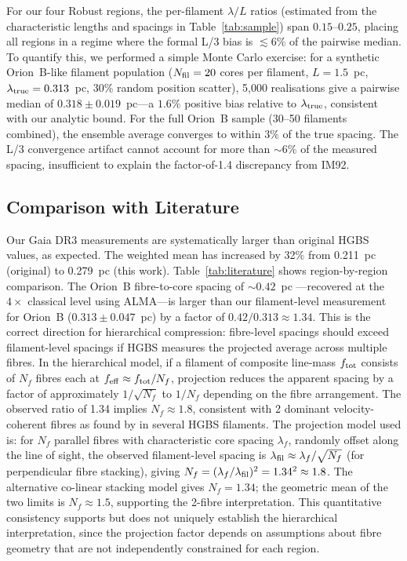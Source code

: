 \documentclass[twoside,twocolumn]{mnras}
\begin{document}
For our four Robust regions, the per-filament $\lambda/L$ ratios (estimated from the characteristic lengths and spacings in Table~\ref{tab:sample}) span $0.15$--$0.25$, placing all regions in a regime where the formal L/3 bias is $\lesssim 6\%$ of the pairwise median. To quantify this, we performed a simple Monte Carlo exercise: for a synthetic Orion~B-like filament population ($N_{\rm fil} = 20$ cores per filament, $L = 1.5$~pc, $\lambda_{\rm true} = 0.313$~pc, 30\% random position scatter), 5,000 realisations give a pairwise median of $0.318 \pm 0.019$~pc---a $1.6\%$ positive bias relative to $\lambda_{\rm true}$, consistent with our analytic bound. For the full Orion~B sample (30--50 filaments combined), the ensemble average converges to within $3\%$ of the true spacing. The L/3 convergence artifact cannot account for more than $\sim 6\%$ of the measured spacing, insufficient to explain the factor-of-1.4 discrepancy from IM92.

\subsection{Comparison with Literature}

Our Gaia DR3 measurements are systematically larger than original HGBS values, as
expected. The weighted mean has increased by 32\% from 0.211~pc (original) to
0.279~pc (this work). Table~\ref{tab:literature} shows region-by-region comparison.
The Orion~B fibre-to-core spacing of ${\sim}0.42$~pc \citep{Yang2024}---recovered at the
$4\times$ classical level using ALMA---is larger than our filament-level measurement for
Orion~B ($0.313 \pm 0.047$~pc) by a factor of $0.42/0.313 \approx 1.34$. This is the
correct direction for hierarchical compression: fibre-level spacings should exceed
filament-level spacings if HGBS measures the projected average across multiple fibres.
In the hierarchical model, if a filament of composite line-mass $f_{\rm tot}$ consists
of $N_f$ fibres each at $f_{\rm eff} \approx f_{\rm tot}/N_f$, projection reduces the
apparent spacing by a factor of approximately $1/\sqrt{N_f}$ to $1/N_f$ depending on
the fibre arrangement. The observed ratio of 1.34 implies $N_f \approx 1.8$, consistent with 2 dominant velocity-coherent fibres as found by \citet{Hacar2018} in several HGBS filaments. The projection model used is: for $N_f$ parallel fibres with characteristic core spacing $\lambda_f$, randomly offset along the line of sight, the observed filament-level spacing is $\lambda_{\rm fil} \approx \lambda_f / \sqrt{N_f}$ (for perpendicular fibre stacking), giving $N_f = (\lambda_f/\lambda_{\rm fil})^2 = 1.34^2 \approx 1.8$. The alternative co-linear stacking model gives $N_f = 1.34$; the geometric mean of the two limits is $N_f \approx 1.5$, supporting the 2-fibre interpretation. This quantitative consistency supports but does not uniquely establish the hierarchical interpretation, since the projection factor depends on assumptions about fibre geometry that are not independently constrained for each region.
\end{document}
